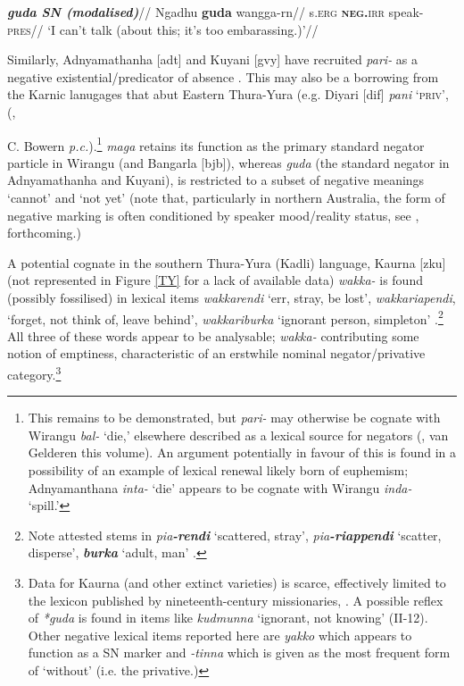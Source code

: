 \documentclass[usenames,dvipsnames,11pt]{article}
\begin{document}
{\a\begingl\glpreamble \textbf{\em{guda} SN (modalised)}//
\gla Ngadhu \textbf{guda} wangga-rn//
\gls{s}.\textsc{erg} \textsc{\textbf{neg.}irr} speak\textsc{-pres}//
\glft`I can't talk (about this; it's too embarassing.)'//\endgl
\xe


 Similarly, Adnyamathanha [\gls{adt}] and Kuyani [\gls{gvy}] have recruited \textit{pari-} as a negative existential/predicator of absence \citep[141]{Hercus1999}. This may also be a borrowing from the Karnic lanugages that abut Eastern Thura-Yura (e.g. Diyari [\gls{dif}] \textit{pani} \textsc{`priv'}, (\citealt{Austin2011}, {C. Bowern \textit{p.c.}).\footnote{This remains to be demonstrated, but \textit{pari-} may otherwise be cognate with Wirangu \textit{bal-} `die,' elsewhere described as a lexical source for negators (\citealt{Veselinova2013}, van Gelderen this volume). An argument potentially in favour of this is found in a possibility of an example of lexical renewal likely born of euphemism; Adnyamanthana \textit{inta-} `die' appears to be cognate with Wirangu \textit{inda-} `spill.'}
\textit{maga} retains its function as the primary standard negator particle in Wirangu (and Bangarla [\gls{bjb}]),  whereas \textit{guda} (the standard negator in Adnyamathanha and Kuyani), is restricted to a subset of negative meanings `cannot' and `not yet' (note that, particularly in northern Australia, the form of negative marking is often conditioned by speaker mood/reality status, see \citealt[225]{Miestamo2005}, \citeauthor{PhillipsFCb} forthcoming.)

A potential cognate in the southern Thura-Yura (Kadli) language, Kaurna [\gls{zku}] (not represented in Figure \ref{TY} for a lack of available data) \textit{wakka-} is found (possibly fossilised) in lexical items \textit{wakkarendi} `err, stray, be lost', \textit{wakkariapendi}, `forget, not think of, leave behind', \textit{wakkariburka} `ignorant person, simpleton' \citep[II-52]{Schurmann1840}.\footnote{Note attested stems in \textit{pia\textbf{-rendi}} `scattered, stray', \textit{pia\textbf{-riappendi}} `scatter, disperse', \textit{\textbf{burka}} `adult, man' \citep[II-4,38]{Schurmann1840}.} All three of these words appear to be analysable; \textit{wakka-} contributing some notion of emptiness, characteristic of an erstwhile nominal negator/privative category.\footnote{Data for Kaurna (and other extinct varieties) is scarce, effectively limited to the lexicon published by nineteenth-century missionaries, \citet{Schurmann1840}. A possible reflex of \textit{*guda} is found in items like \textit{kudmunna} `ignorant, not knowing' (II-12). Other negative lexical items reported here are \textit{yakko} which appears to function as a SN marker and \textit{-tinna} which is given as the most frequent form of `without' (i.e. the privative.)}

}}
\end{document}
